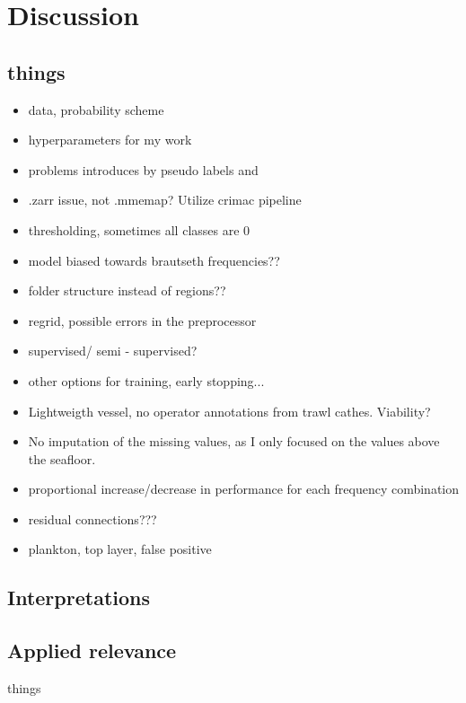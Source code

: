 \chapter{Discussion}
    \section{things}
        \begin{itemize}
            \item data, probability scheme
            \item hyperparameters for my work
            \item problems introduces by pseudo labels and 
            \item .zarr issue, not .mmemap? Utilize crimac pipeline
            \item thresholding, sometimes all classes are 0
            \item model biased towards brautseth frequencies??
            \item folder structure instead of regions??
            \item regrid, possible errors in the preprocessor 
            \item supervised/ semi - supervised? 
            \item other options for training, early stopping...
            \item Lightweigth vessel, no operator annotations from trawl cathes. Viability?
            \item No imputation of the missing values, as I only focused on the values above the seafloor.
            \item proportional increase/decrease in performance for each frequency combination 
            \item residual connections??? \cite{zhang2018road}
            \item plankton, top layer, false positive
        \end{itemize}

    \section{Interpretations}
    \section{Applied relevance}
        things
    